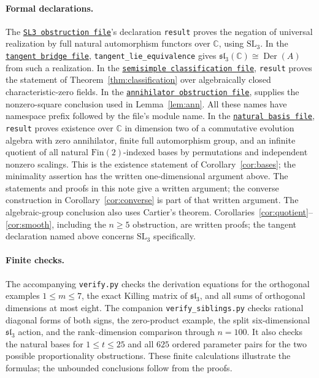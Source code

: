 \documentclass[11pt]{article}
\DeclareMathOperator{\Der}{Der}
\newcommand{\slie}{\mathfrak{sl}}
\newcommand{\C}{\mathbb C}
\newcommand{\leanlink}[2]{\href{https://github.com/the-omega-institute/trureturing/blob/da4f665789a4b88cdf9eda07a8454fc517979ba5/D5/S3/QuadraticForms/EvolutionAlgebras/#1.lean}{\texttt{#2}}}
\begin{document}
\paragraph{Formal declarations.}
The \leanlink{AlgebraicGroupRealizationRefutation}{SL3 obstruction file}'s
declaration \texttt{result} proves
the negation of universal realization by full natural automorphism functors
over $\C$, using $\mathrm{SL}_3$.
In the \leanlink{EvolutionAutomorphismTangentBridge}{tangent bridge file},
\texttt{tangent\_lie\_equivalence} gives
$\slie_3(\C)\cong\Der(A)$ from such a realization.
In the \leanlink{SemisimpleDerivationClassification}{semisimple classification file},
\texttt{result} proves the statement of
Theorem~\ref{thm:classification} over algebraically closed characteristic-zero fields.
In the \leanlink{DerivationAnnihilatorObstruction}{annihilator obstruction file},
 supplies the
nonzero-square conclusion used in Lemma~\ref{lem:ann}.
All these names have namespace prefix
 followed by the file's module name.
In the \leanlink{FiniteAutomorphismsInfiniteNaturalBases}{natural basis file},
\texttt{result} proves existence over $\C$ in dimension two of a
commutative evolution algebra with zero annihilator, finite full
automorphism group, and an infinite quotient of all natural
$\mathrm{Fin}(2)$-indexed bases by permutations and independent nonzero
scalings. This is the existence statement of Corollary~\ref{cor:bases};
the minimality assertion has the written one-dimensional argument above.
The statements and proofs in this note give a written argument; the
converse construction in Corollary~\ref{cor:converse} is part of that written
argument. The algebraic-group conclusion also uses Cartier's theorem.
Corollaries~\ref{cor:quotient}--\ref{cor:smooth}, including the
$n\ge5$ obstruction, are written proofs; the tangent declaration named
above concerns $\mathrm{SL}_3$ specifically.

\paragraph{Finite checks.}
The accompanying \texttt{verify.py} checks the derivation equations for the
orthogonal examples $1\le m\le7$, the exact Killing matrix of $\slie_3$,
and all sums of orthogonal dimensions at most eight. The companion
\texttt{verify\_siblings.py} checks rational diagonal forms of both signs,
the zero-product example, the split six-dimensional $\slie_3$ action,
and the rank--dimension comparison through $n=100$.
It also checks the natural bases for $1\le t\le25$ and all $625$
ordered parameter pairs for the two possible proportionality obstructions.
These finite calculations
illustrate the formulas; the unbounded conclusions follow from the proofs.
\end{document}

